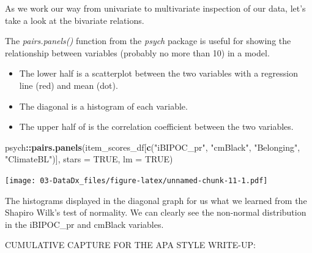 \documentclass[
  11pt,
]{book}
\newenvironment{Shaded}{\begin{snugshade}}{\end{snugshade}}
\newcommand{\AttributeTok}[1]{\textcolor[rgb]{0.27,0.27,0.27}{#1}}
\newcommand{\ConstantTok}[1]{\textcolor[rgb]{0.37,0.37,0.37}{#1}}
\newcommand{\FunctionTok}[1]{\textcolor[rgb]{0.27,0.27,0.27}{\textbf{#1}}}
\newcommand{\NormalTok}[1]{#1}
\newcommand{\SpecialCharTok}[1]{\textcolor[rgb]{0.43,0.43,0.43}{\textbf{#1}}}
\newcommand{\StringTok}[1]{\textcolor[rgb]{0.5,0.5,0.5}{#1}}
\providecommand{\tightlist}{%
  \setlength{\itemsep}{0pt}\setlength{\parskip}{0pt}}
\begin{document}
As we work our way from univariate to multivariate inspection of our data, let's take a look at the bivariate relations.

The \emph{pairs.panels()} function from the \emph{psych} package is useful for showing the relationship between variables (probably no more than 10) in a model.

\begin{itemize}
\tightlist
\item
  The lower half is a scatterplot between the two variables with a regression line (red) and mean (dot).\\
\item
  The diagonal is a histogram of each variable.\\
\item
  The upper half of is the correlation coefficient between the two variables.
\end{itemize}

\begin{Shaded}
\begin{Highlighting}[]
\NormalTok{psych}\SpecialCharTok{::}\FunctionTok{pairs.panels}\NormalTok{(item\_scores\_df[}\FunctionTok{c}\NormalTok{(}\StringTok{"iBIPOC\_pr"}\NormalTok{, }\StringTok{"cmBlack"}\NormalTok{, }\StringTok{"Belonging"}\NormalTok{,}
    \StringTok{"ClimateBL"}\NormalTok{)], }\AttributeTok{stars =} \ConstantTok{TRUE}\NormalTok{, }\AttributeTok{lm =} \ConstantTok{TRUE}\NormalTok{)}
\end{Highlighting}
\end{Shaded}

\texttt{[image: 03-DataDx\_files/figure-latex/unnamed-chunk-11-1.pdf]}

The histograms displayed in the diagonal graph for us what we learned from the Shapiro Wilk's test of normality. We can clearly see the non-normal distribution in the iBIPOC\_pr and cmBlack variables.

CUMULATIVE CAPTURE FOR THE APA STYLE WRITE-UP:
\end{document}
